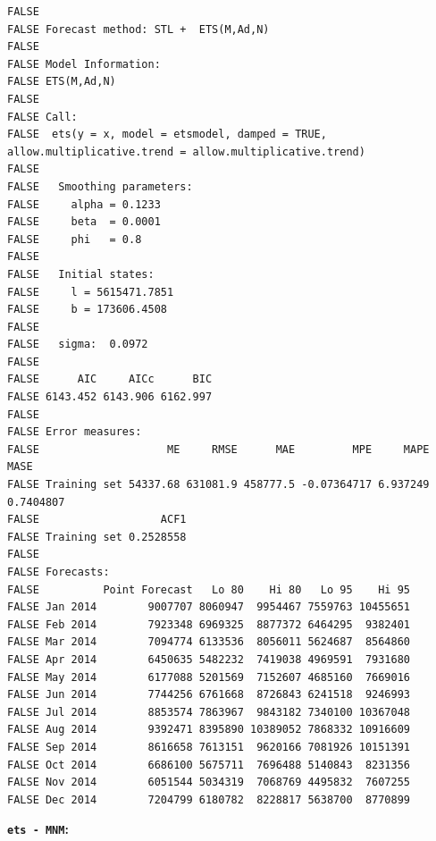 \documentclass[openany]{book}
\begin{document}
\begin{verbatim}
FALSE 
FALSE Forecast method: STL +  ETS(M,Ad,N)
FALSE 
FALSE Model Information:
FALSE ETS(M,Ad,N) 
FALSE 
FALSE Call:
FALSE  ets(y = x, model = etsmodel, damped = TRUE, allow.multiplicative.trend = allow.multiplicative.trend) 
FALSE 
FALSE   Smoothing parameters:
FALSE     alpha = 0.1233 
FALSE     beta  = 0.0001 
FALSE     phi   = 0.8 
FALSE 
FALSE   Initial states:
FALSE     l = 5615471.7851 
FALSE     b = 173606.4508 
FALSE 
FALSE   sigma:  0.0972
FALSE 
FALSE      AIC     AICc      BIC 
FALSE 6143.452 6143.906 6162.997 
FALSE 
FALSE Error measures:
FALSE                    ME     RMSE      MAE         MPE     MAPE      MASE
FALSE Training set 54337.68 631081.9 458777.5 -0.07364717 6.937249 0.7404807
FALSE                   ACF1
FALSE Training set 0.2528558
FALSE 
FALSE Forecasts:
FALSE          Point Forecast   Lo 80    Hi 80   Lo 95    Hi 95
FALSE Jan 2014        9007707 8060947  9954467 7559763 10455651
FALSE Feb 2014        7923348 6969325  8877372 6464295  9382401
FALSE Mar 2014        7094774 6133536  8056011 5624687  8564860
FALSE Apr 2014        6450635 5482232  7419038 4969591  7931680
FALSE May 2014        6177088 5201569  7152607 4685160  7669016
FALSE Jun 2014        7744256 6761668  8726843 6241518  9246993
FALSE Jul 2014        8853574 7863967  9843182 7340100 10367048
FALSE Aug 2014        9392471 8395890 10389052 7868332 10916609
FALSE Sep 2014        8616658 7613151  9620166 7081926 10151391
FALSE Oct 2014        6686100 5675711  7696488 5140843  8231356
FALSE Nov 2014        6051544 5034319  7068769 4495832  7607255
FALSE Dec 2014        7204799 6180782  8228817 5638700  8770899
\end{verbatim}

\textbf{\texttt{ets\ -\ MNM}:}
\end{document}
